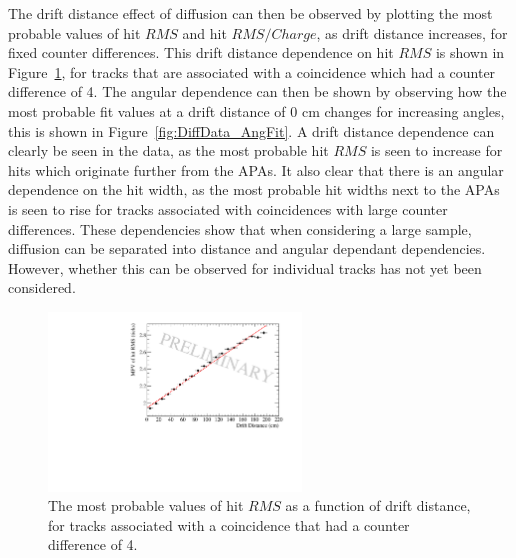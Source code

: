 The drift distance effect of diffusion can then be observed by plotting the most probable values of hit $RMS$ and hit $RMS/Charge$, as drift distance increases, for fixed counter differences. This drift distance dependence on hit $RMS$ is shown in Figure~\ref{fig:CDiff4DataFit}, for tracks that are associated with a coincidence which had a counter difference of 4. The angular dependence can then be shown by observing how the most probable fit values at a drift distance of 0 cm changes for increasing angles, this is shown in Figure~\ref{fig:DiffData_AngFit}. A drift distance dependence can clearly be seen in the data, as the most probable hit $RMS$ is seen to increase for hits which originate further from the APAs. It also clear that there is an angular dependence on the hit width, as the most probable hit widths next to the APAs is seen to rise for tracks associated with coincidences with large counter differences. These dependencies show that when considering a large sample, diffusion can be separated into distance and angular dependant dependencies. However, whether this can be observed for individual tracks has not yet been considered. \\

\begin{figure}[h!]
  \centering
  \includegraphics[width=0.6\textwidth]{CounterDiff4_Data}
  \caption[The drift distance dependence of diffusion in the 35 ton dataset for coincidences with a counter difference of 4]
          {The most probable values of hit $RMS$ as a function of drift distance, for tracks associated with a coincidence that had a counter difference of 4.}
  \label{fig:CDiff4DataFit}
\end{figure}

